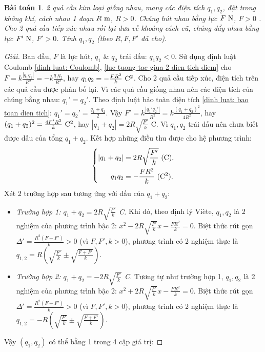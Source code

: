 \documentclass[oneside]{book}
\numberwithin{equation}{section}
\newtheorem{baitoan}{Bài toán}[section]
\begin{document}
\begin{baitoan}
	2 quả cầu kim loại giống nhau, mang các điện tích $q_1,q_2$, đặt trong không khí, cách nhau 1 đoạn $R\ {\rm m}$, $R > 0$. Chúng hút nhau bằng lực $F\ {\rm N}$, $F > 0$ . Cho 2 quả cầu tiếp xúc nhau rồi lại đưa về khoảng cách cũ, chúng đẩy nhau bằng lực $F'\ {\rm N}$, $F' > 0$. Tính $q_1,q_2$ (theo $R,F,F'$ đã cho).
\end{baitoan}

\begin{proof}[Giải]
	Ban đầu, $F$ là lực hút, $q_1$ \& $q_2$ trái dấu: $q_1q_2 < 0$. Sử dụng định luật Coulomb \ref{dinh luat: Coulomb}, \eqref{luc tuong tac giua 2 dien tich diem} cho $F = k\frac{|q_1q_2|}{R^2} = -k\frac{q_1q_2}{R^2}$, hay $q_1q_2 = -\frac{FR^2}{k}\ {\rm C}^2$. Cho 2 quả cầu tiếp xúc, điện tích trên các quả cầu được phân bố lại. Vì các quả cầu giống nhau nên các điện tích của chúng bằng nhau: $q_1' = q_2'$. Theo định luật bảo toàn điện tích \ref{dinh luat: bao toan dien tich}: $q_1' = q_2' = \frac{q_1 + q_2}{2}$. Vậy $F' = k\frac{|q_1'q_2'|}{R^2} = k\frac{(q_1 + q_2)^2}{4R^2}$, hay $(q_1 + q_2)^2 = \frac{4F'R^2}{k}\ {\rm C^2}$, hay $|q_1 + q_2| = 2R\sqrt{\frac{F'}{k}}$ C. Vì $q_1,q_2$ trái dấu nên chưa biết được dấu của tổng $q_1 + q_2$. Kết hợp những điều thu được cho hệ phương trình:
	\begin{equation*}
		\left\{\begin{split}
			|q_1 + q_2| &= 2R\sqrt{\frac{F'}{k}}\ ({\rm C}),\\
			q_1q_2 &= -\frac{FR^2}{k}\ ({\rm C}^2).
		\end{split}\right.
	\end{equation*}
	Xét 2 trường hợp sau tương ứng với dấu của $q_1 + q_2$:
	\begin{itemize}
		\item \textit{Trường hợp 1: $q_1 + q_2 = 2R\sqrt{\frac{F'}{k}}$ C.} Khi đó, theo định lý Vi\`ete, $q_1,q_2$ là 2 nghiệm của phương trình bậc 2: $x^2 - 2R\sqrt{\frac{F'}{k}}x - \frac{FR^2}{k} = 0$. Biệt thức rút gọn $\Delta' = \frac{R^2(F + F')}{k} > 0$ (vì $F,F',k > 0$), phương trình có 2 nghiệm thực là $q_{1,2} = R\left(\sqrt{\frac{F'}{k}}\pm\sqrt{\frac{F + F'}{k}}\right)$.
		\item \textit{Trường hợp 2: $q_1 + q_2 = -2R\sqrt{\frac{F'}{k}}$ C.} Tương tự như trường hợp 1, $q_1,q_2$ là 2 nghiệm của phương trình bậc 2: $x^2 + 2R\sqrt{\frac{F'}{k}}x - \frac{FR^2}{k} = 0$. Biệt thức rút gọn $\Delta' = \frac{R^2(F + F')}{k} > 0$ (vì $F,F',k > 0$), phương trình có 2 nghiệm thực là $q_{1,2} = -R\left(\sqrt{\frac{F'}{k}}\pm\sqrt{\frac{F + F'}{k}}\right)$.
	\end{itemize}
	Vậy $(q_1,q_2)$ có thể bằng 1 trong 4 cặp giá trị:
	

\end{proof}
\end{document}
